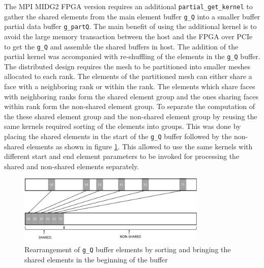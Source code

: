 The MPI MIDG2 FPGA version requires an additional \texttt{partial\_get\_kernel} to gather the shared elements from
the main element buffer \texttt{g\_Q} into a smaller buffer partial data buffer \texttt{g\_partQ}.
The main benefit of using the additional kernel is to avoid the large memory transaction between the
host and the FPGA over PCIe to get the \texttt{g\_Q} and assemble the shared buffers in host.
The addition of the partial kernel was accompanied with re-shuffling of the elements in the \texttt{g\_Q}
buffer. The distributed design requires the mesh to be partitioned into smaller meshes allocated
to each rank. The elements of the partitioned mesh can either share a face with a neighboring
rank or within the rank. The elements which share faces with neighboring ranks form the shared
element group and the ones sharing faces within rank form the non-shared element group.
To separate the computation of the these shared element group and the non-shared element group
by reusing the same kernels required sorting of the elements into groups. This was done by
placing the shared elements in the start of the \texttt{g\_Q} buffer followed by the non-shared
elements as shown in figure \ref{fig:rearrange}. This allowed to use the same kernels with different
start and end element parameters
to be invoked for processing the shared and non-shared elements separately.
\begin{figure}%
    \centering
    \includegraphics[width=0.8\textwidth]{images/rearrange}
    \caption{Rearrangement of \texttt{g\_Q} buffer elements by sorting and bringing the
    shared elements in the beginning of the buffer}
    \label{fig:rearrange}
\end{figure}

